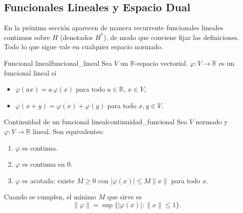 \documentclass[11pt, a4paper]{article}
\begin{document}
\subsection{Funcionales Lineales y Espacio Dual}

En la próxima sección aparecen de manera recurrente funcionales lineales continuos sobre $H$
(denotados $H^*$), de modo que conviene fijar las definiciones. Todo lo que sigue vale en cualquier
espacio normado.

\begin{definicion}{Funcional lineal}{funcional_lineal}
Sea $V$ un $\mathbb{R}$-espacio vectorial. $\varphi: V \to \mathbb{R}$ es un funcional lineal si
\begin{itemize}
    \item $\varphi(ax) = a\,\varphi(x)$ para todo $a \in \mathbb{R}$, $x \in V$,
    \item $\varphi(x+y) = \varphi(x) + \varphi(y)$ para todo $x, y \in V$.
\end{itemize}
\end{definicion}

\begin{proposicion}{Continuidad de un funcional lineal}{continuidad_funcional}
Sea $V$ normado y $\varphi: V \to \mathbb{R}$ lineal. Son equivalentes:
\begin{enumerate}
    \item $\varphi$ es continua.
    \item $\varphi$ es continua en $0$.
    \item $\varphi$ es acotada: existe $M \ge 0$ con $|\varphi(x)| \le M \|x\|$ para todo $x$.
\end{enumerate}
Cuando se cumplen, el mínimo $M$ que sirve es
$$ \|\varphi\| = \sup \{ |\varphi(x)| : \|x\| \le 1 \}. $$
\end{proposicion}
\end{document}
